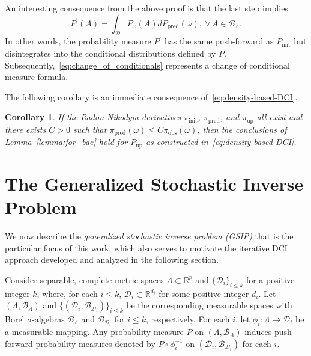 \documentclass{article}
\newtheorem{corollary}{Corollary}[section]
\newcommand{\B}{\mathcal{B}}
\newcommand{\updatemeas}{P_{\text{up}}}
\newcommand{\initdens}{\pi_{\text{init}}}
\newcommand{\updatedens}{\pi_{\text{up}}}
\newcommand{\predictmeas}{P_\text{pred}}
\newcommand{\predictdens}{\pi_\text{pred}}
\newcommand{\obsdens}{\pi_{\text{obs}}}
\begin{document}
An interesting consequence from the above proof is that the last step implies
\begin{equation*}
P^{\prime}(A) = \int_{\mathcal{D}}P_{\omega}(A) d\predictmeas(\omega), \ \forall \, A\in\B_\Lambda.
\end{equation*}
In other words, the probability measure $P^{\prime}$ has the same push-forward as $P_\text{init}$ but disintegrates into the conditional distributions defined by $P$.
Subsequently,~\eqref{eq:change_of_conditionals} represents a change of conditional measure formula.

The following corollary is an immediate consequence of~\eqref{eq:density-based-DCI}.

\begin{corollary}
If the Radon-Nikodym derivatives $\initdens$, $\predictdens$, and $\updatedens$ all exist and there exists $C> 0$ such that $\predictdens(\omega)\leq C\obsdens(\omega)$, then the conclusions of Lemma~\ref{lemma:for_bac} hold for $\updatemeas$ as constructed in~\eqref{eq:density-based-DCI}.
\end{corollary}


\section{The Generalized Stochastic Inverse Problem}\label{sec:GSIP}
We now describe the \textit{generalized stochastic inverse problem (GSIP)} that is the particular focus of this work, which also serves to motivate the iterative DCI approach developed and analyzed in the following section. 

Consider separable, complete metric spaces $\Lambda\subset\mathbb{R}^p$ and $\{\mathcal{D}_{i}\}_{i \le k}$ for a positive integer $k$, where, for each $i\le k$, $\mathcal{D}_i\subset\mathbb{R}^{d_i}$ for some positive integer $d_i$. 
Let $(\Lambda, \B_{\Lambda})$ and $\{(\mathcal{D}_{i}, \B_{\mathcal{D}_{i}})\}_{i \le k}$ be the corresponding measurable spaces with Borel $\sigma$-algebras $\B_{\Lambda}$ and $\B_{\mathcal{D}_{i}}$ for $i\le k$, respectively. 
For each $i$, let $\phi_{i}: \Lambda \rightarrow \mathcal{D}_{i}$ be a measurable mapping. 
Any probability measure $P$ on $(\Lambda, \B_\Lambda)$ induces push-forward probability measures denoted by $P\circ \phi_{i}^{-1}$ on $(\mathcal{D}_i, \B_{\mathcal{D}_i})$ for each $i$. 
\end{document}
